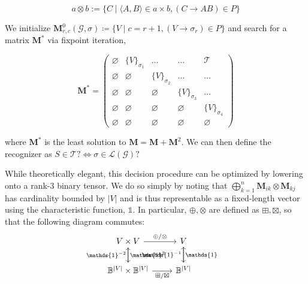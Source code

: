 \documentclass[sigplan,nonacm]{acmart}\settopmatter{printfolios=false,printccs=false,printacmref=false}
\begin{document}
\vspace{-7pt}
\[
a \otimes b := \{C \mid \langle A, B\rangle \in a \times b, (C\rightarrow AB) \in P\}
\]

\noindent We initialize $\mathbf{M}^0_{r,c}(\mathcal{G}, \sigma) \coloneqq \{V \mid c = r + 1, (V \rightarrow \sigma_r) \in P\}$ and search for a matrix $\mathbf{M}^*$ via fixpoint iteration,

\vspace{-5}
\[
\mathbf{M}^* = \begin{pmatrix}
            \varnothing & \{V\}_{\sigma_1} & \ldots & \ldots & \mathcal{T} \\
            \varnothing & \varnothing & \{V\}_{\sigma_2} & \ldots & \ldots \\
            \varnothing & \varnothing & \varnothing & \{V\}_{\sigma_3} & \ldots \\
            \varnothing & \varnothing & \varnothing & \varnothing & \{V\}_{\sigma_4} \\
            \varnothing & \varnothing & \varnothing & \varnothing & \varnothing
\end{pmatrix}
\]

\noindent where $\mathbf{M}^*$ is the least solution to $\mathbf{M} = \mathbf{M} + \mathbf{M}^2$. We can then define the recognizer as $S \in \mathcal{T}? \iff \sigma \in \mathcal{L}(\mathcal{G})?$ %

While theoretically elegant, this decision procedure can be optimized by lowering onto a rank-3 binary tensor. We do so simply by noting that $\bigoplus_{k = 1}^n \mathbf{M}_{ik} \otimes \mathbf{M}_{kj}$ has cardinality bounded by $|V|$ and is thus representable as a fixed-length vector using the characteristic function, $\mathds{1}$. In particular, $\oplus, \otimes$ are defined as $\boxplus, \boxtimes$, so that the following diagram commutes:
\[\begin{tikzcd}
      V \times V \arrow[r, "\oplus/\otimes"] \arrow[d, "\mathds{1}^2"]
      & V \arrow[d, "\mathds{1}\phantom{^{-1}}"] \\
      \mathbb{B}^{|V|} \times \mathbb{B}^{|V|} \arrow[r, "\boxplus/\boxtimes", labels=below] \arrow[u, "\mathds{1}^{-2}"]
      & \mathbb{B}^{|V|} \arrow[u, "\mathds{1}^{-1}"]
\end{tikzcd}\]
\end{document}
